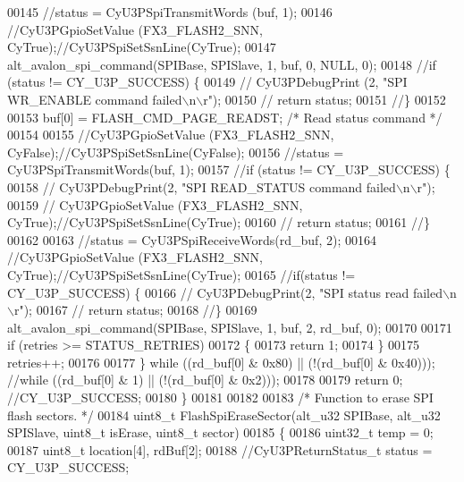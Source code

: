 \begin{DoxyCode}
00145         \textcolor{comment}{//status = CyU3PSpiTransmitWords (buf, 1);}
00146         \textcolor{comment}{//CyU3PGpioSetValue (FX3\_FLASH2\_SNN, CyTrue);//CyU3PSpiSetSsnLine(CyTrue);}
00147         alt_avalon_spi_command(SPIBase, SPISlave, 1, buf, 0, NULL, 0);
00148         \textcolor{comment}{//if (status != CY\_U3P\_SUCCESS) \{}
00149         \textcolor{comment}{//    CyU3PDebugPrint (2, "SPI WR\_ENABLE command failed\(\backslash\)n\(\backslash\)r");}
00150         \textcolor{comment}{//    return status;}
00151         \textcolor{comment}{//\}}
00152 
00153         buf[0] = FLASH_CMD_PAGE_READST;  \textcolor{comment}{/* Read status command */}
00154 
00155         \textcolor{comment}{//CyU3PGpioSetValue (FX3\_FLASH2\_SNN, CyFalse);//CyU3PSpiSetSsnLine(CyFalse);}
00156         \textcolor{comment}{//status = CyU3PSpiTransmitWords(buf, 1);}
00157         \textcolor{comment}{//if (status != CY\_U3P\_SUCCESS) \{}
00158         \textcolor{comment}{//    CyU3PDebugPrint(2, "SPI READ\_STATUS command failed\(\backslash\)n\(\backslash\)r");}
00159         \textcolor{comment}{//    CyU3PGpioSetValue (FX3\_FLASH2\_SNN, CyTrue);//CyU3PSpiSetSsnLine(CyTrue);}
00160         \textcolor{comment}{//    return status;}
00161         \textcolor{comment}{//\}}
00162 
00163         \textcolor{comment}{//status = CyU3PSpiReceiveWords(rd\_buf, 2);}
00164         \textcolor{comment}{//CyU3PGpioSetValue (FX3\_FLASH2\_SNN, CyTrue);//CyU3PSpiSetSsnLine(CyTrue);}
00165         \textcolor{comment}{//if(status != CY\_U3P\_SUCCESS) \{}
00166         \textcolor{comment}{//    CyU3PDebugPrint(2, "SPI status read failed\(\backslash\)n\(\backslash\)r");}
00167         \textcolor{comment}{//    return status;}
00168         \textcolor{comment}{//\}}
00169         alt_avalon_spi_command(SPIBase, SPISlave, 1, buf, 2, rd\_buf, 0);
00170 
00171         \textcolor{keywordflow}{if} (retries >= STATUS_RETRIES)
00172         \{
00173             \textcolor{keywordflow}{return} 1;
00174         \}
00175         retries++;
00176 
00177     \} \textcolor{keywordflow}{while} ((rd\_buf[0] & 0x80) || (!(rd\_buf[0] & 0x40))); \textcolor{comment}{//while ((rd\_buf[0] & 1) || (!(rd\_buf[0] &
       0x2)));}
00178 
00179     \textcolor{keywordflow}{return} 0; \textcolor{comment}{//CY\_U3P\_SUCCESS;}
00180 \}
00181 
00182 
00183 \textcolor{comment}{/* Function to erase SPI flash sectors. */}
00184 uint8\_t FlashSpiEraseSector(alt_u32 SPIBase, alt_u32 SPISlave, uint8\_t isErase, uint8\_t sector)
00185 \{
00186     uint32\_t temp = 0;
00187     uint8\_t  location[4], rdBuf[2];
00188     \textcolor{comment}{//CyU3PReturnStatus\_t status = CY\_U3P\_SUCCESS;}

\end{DoxyCode}
